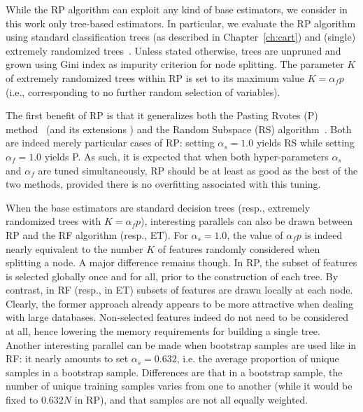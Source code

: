 
While the RP algorithm can exploit any kind of base estimators, we consider in
this work only tree-based estimators. In particular, we evaluate the RP
algorithm using  standard classification trees (as described in
Chapter~\ref{ch:cart}) and (single) extremely randomized
trees~\citep{geurts:2006}. Unless stated otherwise, trees are unpruned and
grown using Gini index as impurity criterion for node splitting. The
parameter $K$ of extremely randomized trees within RP is set to its maximum
value $K=\alpha_f p$ (i.e., corresponding to no further random selection of
variables).

The first benefit of RP is that it generalizes both the Pasting Rvotes (P)
method~\citep{breiman:1999} (and its extensions \citep{chawla:2004,basilico:2011})
and the Random Subspace (RS) algorithm~\citep{ho:1998}. Both are indeed merely
particular cases of RP: setting $\alpha_s=1.0$ yields RS while setting
$\alpha_f=1.0$ yields P. As such, it is expected that when both
hyper-parameters $\alpha_s$ and $\alpha_f$ are tuned simultaneously, RP should be at
least as good as the best of the two methods, provided there is no overfitting
associated with this tuning.

When the base estimators are standard decision trees (resp., extremely
randomized trees with $K=\alpha_f p$), interesting parallels can also be
drawn between RP and the RF algorithm (resp., ET). For $\alpha_s=1.0$, the
value of $\alpha_f p$ is indeed nearly equivalent to the number $K$ of
features randomly considered when splitting a node. A major difference
remains though. In RP, the subset of features is selected globally
once and for all, prior to the construction of each tree. By contrast,
in RF (resp., in ET) subsets of features are drawn locally at each
node. Clearly, the former approach already appears to be more
attractive when dealing with large databases. Non-selected features
indeed do not need to be considered at all, hence lowering the memory
requirements for building a single tree. Another interesting parallel
can be made when bootstrap samples are used like in RF: it nearly
amounts to set $\alpha_s=0.632$, i.e. the average proportion of unique
samples in a bootstrap sample. Differences are that in a bootstrap
sample, the number of unique training samples varies from one to
another (while it would be fixed to $0.632 N$ in RP), and that
samples are not all equally weighted.

